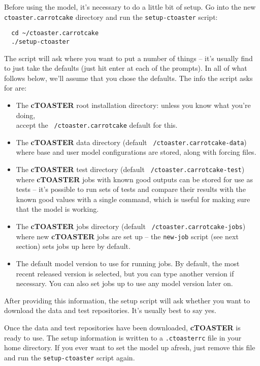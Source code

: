 \documentclass[a4paper,10pt,article]{memoir}
\begin{document}
Before using the model, it's necessary to do a little bit of setup.
Go into the new \texttt{ctoaster.carrotcake} directory and run the
\texttt{setup-ctoaster} script:
\begin{verbatim}
  cd ~/ctoaster.carrotcake
  ./setup-ctoaster
\end{verbatim}
The script will ask where you want to put a number of things -- it's usually find to just take the defaults (just hit enter at each of the prompts).  In all of what follows below, we'll assume that you chose the defaults. The
info the script asks for are:
\begin{itemize}
  \item{The \textbf{cTOASTER} root installation directory: unless you know what
    you're doing, 
    \\accept the \texttt{~/ctoaster.carrotcake} default for this.}
  \item{The \textbf{cTOASTER} data directory (default \texttt{~/ctoaster.carrotcake-data})
    where base and user model configurations are stored, along with
    forcing files.}
  \item{The \textbf{cTOASTER} test directory (default \texttt{~/ctoaster.carrotcake-test})
    where \textbf{cTOASTER} jobs with known good outputs can be stored for use as
    tests -- it's possible to run sets of tests and compare their
    results with the known good values with a single command, which is
    useful for making sure that the model is working.}
  \item{The \textbf{cTOASTER} jobs directory (default \texttt{~/ctoaster.carrotcake-jobs})
    where new \textbf{cTOASTER} jobs are set up -- the \texttt{new-job} script
    (see next section) sets jobs up here by default.}
  \item{The default model version to use for running jobs. 
    By default, the most recent released version is selected, 
    but you can  type another version if necessary. 
    You can also set jobs up to  use any model version later on.}
\end{itemize}
After providing this information, the setup script will ask whether you want to download the data and test repositories. It's usually best to say yes.

Once the data and test repositories have been downloaded, \textbf{cTOASTER} is ready to use.  The setup information is written to a \texttt{.ctoasterrc} file in your home directory. If you ever want to set the model up afresh, just remove this file and run the \texttt{setup-ctoaster} script again.
\end{document}
